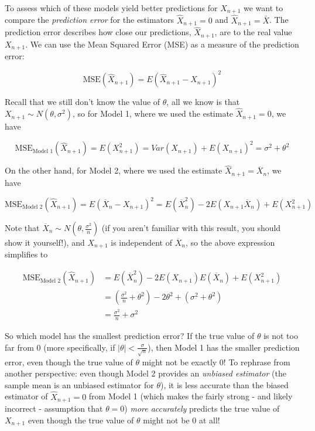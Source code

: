 To assess which of these models yield better predictions for $X_{n + 1}$ we want to compare the \textit{prediction error} for the estimators $\hat{X}_{n + 1} = 0$ and $\hat{X}_{n + 1} = \bar{X}$. The prediction error describes how close our predictions, $\hat{X}_{n + 1}$, are to the real value $X_{n + 1}$. We can use the Mean Squared Error (MSE) as a measure of the prediction error:

$$\text{MSE}(\hat{X}_{n + 1}) = E\left( \hat{X}_{n + 1} - X_{n + 1}\right)^2$$


Recall that we still don't know the value of $\theta$, all we know is that $X_{n + 1} \sim N(\theta, \sigma^2)$, so for Model 1, where we used the estimate $\hat{X}_{n + 1} = 0$, we have

$$\text{MSE}_{\text{Model 1}}(\hat{X}_{n + 1}) = E(X_{n + 1}^2) = Var(X_{n + 1}) + E(X_{n + 1})^2 = \sigma^2 + \theta^2$$

On the other hand, for Model 2, where we used the estimate $\hat{X}_{n + 1} = \overline{X}_n$, we have

$$\text{MSE}_{\text{Model 2}}(\hat{X}_{n + 1}) =  E(\overline{X}_n - X_{n + 1})^2 = E(\overline{X}_{n}^2) - 2E(X_{n + 1}\overline{X}_{n}) + E(X_{n + 1}^2)$$

Note that $\overline{X}_n \sim N\left(\theta, \frac{\sigma^2}{n}\right)$ (if you aren't familiar with this result, you should show it yourself!), and $X_{n + 1}$ is independent of $\overline{X}_n$, so the above expression simplifies to

\begin{align*}
\text{MSE}_{\text{Model 2}}(\hat{X}_{n + 1}) &=  E\left(\overline{X}_{n}^2\right) - 2E(X_{n + 1})E(\overline{X}_{n}) + E(X_{n + 1}^2)\\
& = \left(\frac{\sigma^2}{n} + \theta^2\right) - 2 \theta^2  + (\sigma^2 + \theta^2)\\
& = \frac{\sigma^2}{n} + \sigma^2
\end{align*}


So which model has the smallest prediction error? If the true value of $\theta$ is not too far from $0$ (more specifically, if $|\theta| < \frac{\sigma}{\sqrt{n}}$), then Model 1 has the smaller prediction error, even though the true value of $\theta$ might not be exactly $0$! To rephrase from another perspective: even though Model 2 provides an \textit{unbiased estimator} (the sample mean is an unbiased estimator for $\theta$), it is less accurate than the biased estimator of $\hat{X}_{n + 1} = 0$ from Model 1 (which makes the fairly strong - and likely incorrect - assumption that $\theta = 0$) \textit{more accurately} predicts the true value of $X_{n + 1}$ even though the true value of $\theta$ might not be 0 at all!

